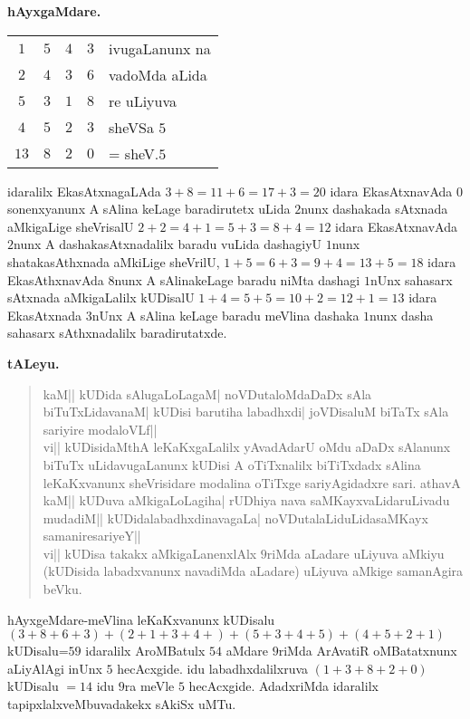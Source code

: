 \begin{center}
{\large\bf hAyxgaMdare.}
\medskip

\begin{tabular}{ccccl}
$1$ & $5$ & $4$ & $3$ & ivugaLanunx na \\
$2$ & $4$ & $3$ & $6$ & vadoMda aLida\\
$5$ & $3$ & $1$ & $8$ & re uLiyuva\\
$4$ & $5$ & $2$ & $3$ & sheVSa $5$\\
\hline
$13$ & $8$ & $2$ & $0$ & = sheV.$5$\\ 
\hline
\end{tabular}
\end{center}

idaralilx EkasAtxnagaLAda $3+8=11+6=17+3=20$ idara EkasAtxnavAda $0$ sonenxyanunx A sAlina keLage baradirutetx uLida $2$nunx dashakada sAtxnada aMkigaLige sheVrisalU $2+2=4+1=5+3=8+4=12$ idara EkasAtxnavAda $2$nunx A dashakasAtxnadalilx baradu vuLida dashagiyU $1$nunx shatakasAthxnada aMkiLige sheVrilU, $1+5=6+3=9+4=13+5=18$ idara EkasAthxnavAda $8$nunx A sAlinakeLage baradu niMta dashagi $1$nUnx sahasarx sAtxnada aMkigaLalilx kUDisalU $1+4=5+5=10+2=12+1=13$ idara EkasAtxnada $3$nUnx A sAlina keLage baradu meVlina dashaka $1$nunx dasha sahasarx sAthxnadalilx baradirutatxde.

\begin{center}
{\large\bf tALeyu.}
\end{center}

\begin{verse}
kaM|| kUDida sAlugaLoLagaM| noVDutaloMdaDaDx sAla biTuTxLidavanaM| kUDisi barutiha labadhxdi| joVDisaluM biTaTx sAla sariyire modaloVLf||\\

vi|| kUDisidaMthA leKaKxgaLalilx yAvadAdarU oMdu aDaDx sAlanunx biTuTx uLidavugaLanunx kUDisi A oTiTxnalilx biTiTxdadx sAlina leKaKxvanunx sheVrisidare modalina oTiTxge sariyAgidadxre sari. athavA\\

kaM|| kUDuva aMkigaLoLagiha| rUDhiya nava saMKayxvaLidaruLivadu mudadiM|| kUDidalabadhxdinavagaLa| noVDutalaLiduLidasaMKayx samaniresariyeY||\\

vi|| kUDisa takakx aMkigaLanenxlAlx $9$riMda aLadare uLiyuva aMkiyu (kUDisida labadxvanunx navadiMda aLadare) uLiyuva aMkige samanAgira beVku.
\end{verse}

hAyxgeMdare-meVlina leKaKxvanunx kUDisalu $(3+8+6+3)+ (2+1+3+4+)+ (5+3+4+5)+ (4+5+2+1)$ kUDisalu=$59$ idaralilx AroMBatulx $54$ aMdare $9$riMda ArAvatiR oMBatatxnunx aLiyAlAgi inUnx $5$ hecAcxgide. idu labadhxdalilxruva $(1+3+8+2+0)$ kUDisalu $=14$ idu $9$ra meVle $5$ hecAcxgide. AdadxriMda idaralilx tapipxlalxveMbuvadakekx sAkiSx uMTu.

